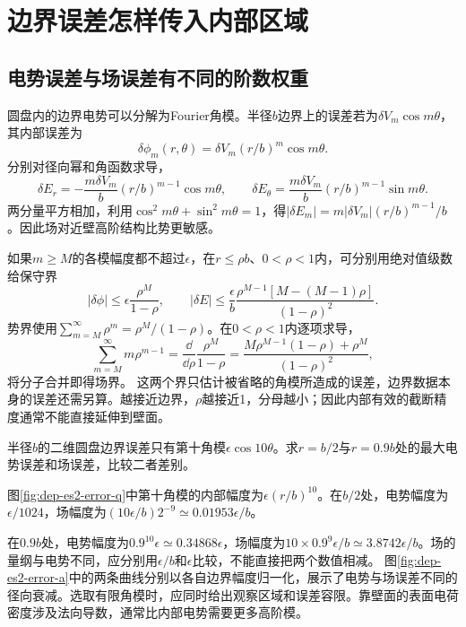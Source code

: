 \section{边界误差怎样传入内部区域}
\subsection{电势误差与场误差有不同的阶数权重}
圆盘内的边界电势可以分解为Fourier角模。半径$b$边界上的误差若为$\delta V_m\cos m\theta$，其内部误差为
\[
 \delta\phi_m(r,\theta)=\delta V_m(r/b)^m\cos m\theta.
\]
分别对径向幂和角函数求导，
\[\delta E_r=-\frac{m\delta V_m}b(r/b)^{m-1}\cos m\theta,\qquad
\delta E_\theta=\frac{m\delta V_m}b(r/b)^{m-1}\sin m\theta.\]
两分量平方相加，利用$\cos^2m\theta+\sin^2m\theta=1$，得$|\delta E_m|=m|\delta V_m|(r/b)^{m-1}/b$。因此场对近壁高阶结构比势更敏感。

如果$m\geq M$的各模幅度都不超过$\epsilon$，在$r\leq\rho b$、$0<\rho<1$内，可分别用绝对值级数给保守界
\[
 |\delta\phi|\leq\epsilon\frac{\rho^M}{1-\rho},\qquad
 |\delta E|\leq\frac\epsilon b
 \frac{\rho^{M-1}[M-(M-1)\rho]}{(1-\rho)^2}.
\]
势界使用$\sum_{m=M}^\infty\rho^m=\rho^M/(1-\rho)$。在$0<\rho<1$内逐项求导，
\[\sum_{m=M}^\infty m\rho^{m-1}
=\frac{\dd}{\dd\rho}\frac{\rho^M}{1-\rho}
=\frac{M\rho^{M-1}(1-\rho)+\rho^M}{(1-\rho)^2},\]
将分子合并即得场界。
这两个界只估计被省略的角模所造成的误差，边界数据本身的误差还需另算。越接近边界，$\rho$越接近1，分母越小；因此内部有效的截断精度通常不能直接延伸到壁面。

\begin{example}[同一高阶边界误差在两个半径处的影响]
半径$b$的二维圆盘边界误差只有第十角模$\epsilon\cos10\theta$。求$r=b/2$与$r=0.9b$处的最大电势误差和场误差，比较二者差别。
\end{example}
\begin{solution}
图\ref{fig:dep-es2-error-q}中第十角模的内部幅度为$\epsilon(r/b)^{10}$。在$b/2$处，电势幅度为$\epsilon/1024$，场幅度为$(10\epsilon/b)2^{-9}\simeq0.01953\epsilon/b$。

在$0.9b$处，电势幅度为$0.9^{10}\epsilon\simeq0.34868\epsilon$，场幅度为$10\times0.9^9\epsilon/b\simeq3.8742\epsilon/b$。场的量纲与电势不同，应分别用$\epsilon/b$和$\epsilon$比较，不能直接把两个数值相减。
图\ref{fig:dep-es2-error-a}中的两条曲线分别以各自边界幅度归一化，展示了电势与场误差不同的径向衰减。选取有限角模时，应同时给出观察区域和误差容限。靠壁面的表面电荷密度涉及法向导数，通常比内部电势需要更多高阶模。
\end{solution}
